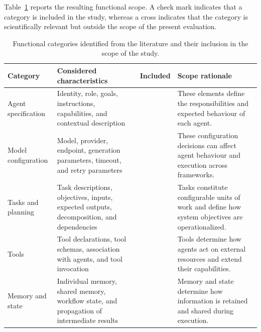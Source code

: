 Table~\ref{tab:functional-scope} reports the resulting functional scope. A
check mark indicates that a category is included in the study, whereas a cross
indicates that the category is scientifically relevant but outside the scope
of the present evaluation.

\begin{table}[t]
    \centering
    \caption{Functional categories identified from the literature and their
    inclusion in the scope of the study.}
    \label{tab:functional-scope}
    \footnotesize
    \begin{tabularx}{\textwidth}{
        @{}
        p{}
        >{\raggedright\arraybackslash}X
        >{\centering\arraybackslash}p{}
        p{}
        @{}
    }
        \toprule
        \textbf{Category}
        & \textbf{Considered characteristics}
        & \textbf{Included}
        & \textbf{Scope rationale} \\
        \midrule

        Agent specification
        & Identity, role, goals, instructions, capabilities, and contextual
        description
        & 
        & These elements define the responsibilities and expected behaviour
        of each agent. \\

        Model configuration
        & Model, provider, endpoint, generation parameters, timeout, and retry
        parameters
        & 
        & These configuration decisions can affect agent behaviour and
        execution across frameworks. \\

        Tasks and planning
        & Task descriptions, objectives, inputs, expected outputs,
        decomposition, and dependencies
        & 
        & Tasks constitute configurable units of work and define how system
        objectives are operationalized. \\

        Tools
        & Tool declarations, tool schemas, association with agents, and tool
        invocation
        & 
        & Tools determine how agents act on external resources and extend
        their capabilities. \\

        Memory and state
        & Individual memory, shared memory, workflow state, and propagation of
        intermediate results
        & 
        & Memory and state determine how information is retained and shared
        during execution. \\


\end{tabularx}
\end{table}
